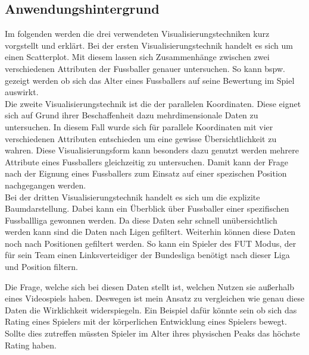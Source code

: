 \documentclass[usegeometry=true]{scrartcl}
\begin{document}
\newpage


\subsection{Anwendungshintergrund}

Im folgenden werden die drei verwendeten Visualisierungstechniken kurz vorgstellt und erklärt.
Bei der ersten Visualisierungstechnik handelt es sich um einen Scatterplot. Mit diesem lassen sich Zusammenhänge zwischen zwei verschiedenen Attributen der Fussballer genauer untersuchen. So kann bspw. gezeigt werden ob sich das Alter eines Fussballers auf seine Bewertung im Spiel auswirkt.\\
Die zweite Visualisierungstechnik ist die der parallelen Koordinaten. Diese eignet sich auf Grund ihrer Beschaffenheit dazu mehrdimensionale Daten zu untersuchen. In diesem Fall wurde sich für parallele Koordinaten mit vier verschiedenen Attributen entschieden um eine gewisse Übersichtlichkeit zu wahren. Diese Visualisierungsform kann besonders dazu genutzt werden mehrere Attribute eines Fussballers gleichzeitig zu untersuchen. Damit kann der Frage nach der Eignung eines Fussballers zum Einsatz auf einer spezischen Position nachgegangen werden.\\
Bei der dritten Visualisierungstechnik handelt es sich um die explizite Baumdarstellung. Dabei kann ein Überblick über Fussballer einer spezifischen Fussballliga gewonnen werden.
Da diese Daten sehr schnell unübersichtlich werden kann sind die Daten nach Ligen gefiltert. Weiterhin können diese Daten noch nach Positionen gefiltert werden. So kann ein Spieler des FUT Modus, der für sein Team einen Linksverteidiger der Bundesliga benötigt nach dieser Liga und Position filtern.

Die Frage, welche sich bei diesen Daten stellt ist, welchen Nutzen sie außerhalb eines Videospiels haben. Deswegen ist mein Ansatz zu vergleichen wie genau diese Daten die Wirklichkeit widerspiegeln. Ein Beispiel dafür könnte sein ob sich das Rating eines Spielers mit der körperlichen Entwicklung eines Spielers bewegt. Sollte dies zutreffen  müssten Spieler im Alter ihres physischen Peaks das höchste Rating haben. 
\end{document}
